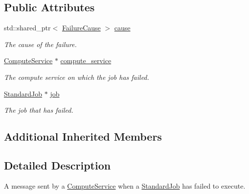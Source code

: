 \subsection*{Public Attributes}
\begin{DoxyCompactItemize}
\item 
\mbox{\label{classwrench_1_1_compute_service_standard_job_failed_message_a84e1ec62e44d09f11f74ee4421517836}} 
std\+::shared\+\_\+ptr$<$ \hyperlink{classwrench_1_1_failure_cause}{Failure\+Cause} $>$ \hyperlink{classwrench_1_1_compute_service_standard_job_failed_message_a84e1ec62e44d09f11f74ee4421517836}{cause}
\begin{DoxyCompactList}\small\item\em The cause of the failure. \end{DoxyCompactList}\item 
\mbox{\label{classwrench_1_1_compute_service_standard_job_failed_message_a3ea340bb53b79cee24b0fe8d4cd9444d}} 
\hyperlink{classwrench_1_1_compute_service}{Compute\+Service} $\ast$ \hyperlink{classwrench_1_1_compute_service_standard_job_failed_message_a3ea340bb53b79cee24b0fe8d4cd9444d}{compute\+\_\+service}
\begin{DoxyCompactList}\small\item\em The compute service on which the job has failed. \end{DoxyCompactList}\item 
\mbox{\label{classwrench_1_1_compute_service_standard_job_failed_message_a0af077da7ddb9ba6b5916e7f9d009278}} 
\hyperlink{classwrench_1_1_standard_job}{Standard\+Job} $\ast$ \hyperlink{classwrench_1_1_compute_service_standard_job_failed_message_a0af077da7ddb9ba6b5916e7f9d009278}{job}
\begin{DoxyCompactList}\small\item\em The job that has failed. \end{DoxyCompactList}\end{DoxyCompactItemize}
\subsection*{Additional Inherited Members}


\subsection{Detailed Description}
A message sent by a \hyperlink{classwrench_1_1_compute_service}{Compute\+Service} when a \hyperlink{classwrench_1_1_standard_job}{Standard\+Job} has failed to execute. 

